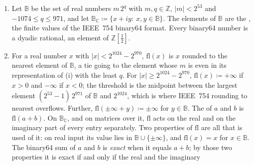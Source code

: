
\begin{definition}\label{def:binary64}
\begin{enumerate}[label=(\roman*),leftmargin=2.4em]
\item Let $\mathbb{B}$ be the set of real numbers $m\,2^{q}$ with
  $m,q\in\mathbb{Z}$, $|m|<2^{53}$ and $-1074\le q\le971$, and let
  $\mathbb{B}_{\mathbb{C}}\coloneqq\{x+iy:\ x,y\in\mathbb{B}\}$. The elements
  of $\mathbb{B}$ are the , the finite values of the
  IEEE~754 binary64 format. Every binary64 number is a dyadic rational, an
  element of $\mathbb{Z}[\tfrac12]$.
\item For a real number $x$ with $|x|<2^{1024}-2^{970}$, $\mathrm{fl}(x)$ is
  $x$ rounded to the nearest element of $\mathbb{B}$, a tie going to the
  element whose $m$ is even in its representation of (i) with the least $q$.
  For $|x|\ge2^{1024}-2^{970}$, $\mathrm{fl}(x)\coloneqq+\infty$ if $x>0$ and
  $-\infty$ if $x<0$; the threshold is the midpoint between the largest
  element $(2^{53}-1)\,2^{971}$ of $\mathbb{B}$ and $2^{1024}$, which is where
  IEEE~754 rounding to nearest overflows. Further,
  $\mathrm{fl}(\pm\infty+y)\coloneqq\pm\infty$ for $y\in\mathbb{B}$. The
   of $a$
  and $b$ is $\mathrm{fl}(a+b)$. On
  $\mathbb{B}_{\mathbb{C}}$, and on matrices over it, $\mathrm{fl}$ acts on the
  real and on the imaginary part of every entry separately. Two properties of
  $\mathrm{fl}$ are all that is used of it: on real input its value lies in
  $\mathbb{B}\cup\{\pm\infty\}$, and $\mathrm{fl}(x)=x$ for $x\in\mathbb{B}$.
  The binary64 sum of $a$ and $b$ is \emph{exact} when it equals $a+b$; by
  those two properties it is exact if and only if the real and the imaginary

\end{enumerate}
\end{definition}
